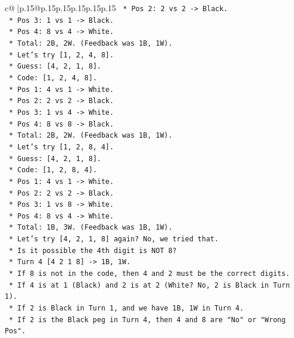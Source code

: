 \documentclass{article}
\begin{document}
{\begin{supertabular}{c@{$\;$}|p{.15\linewidth}@{}p{.15\linewidth}p{.15\linewidth}p{.15\linewidth}p{.15\linewidth}p{.15\linewidth}}
{{{\texttt{        *   Pos 2: 2 vs 2 {-}> Black.} \\
\texttt{        *   Pos 3: 1 vs 1 {-}> Black.} \\
\texttt{        *   Pos 4: 8 vs 4 {-}> White.} \\
\texttt{        *   Total: 2B, 2W. (Feedback was 1B, 1W).} \\
\texttt{    *   Let's try {[}1, 2, 4, 8{]}.} \\
\texttt{        *   Guess: {[}4, 2, 1, 8{]}.} \\
\texttt{        *   Code: {[}1, 2, 4, 8{]}.} \\
\texttt{        *   Pos 1: 4 vs 1 {-}> White.} \\
\texttt{        *   Pos 2: 2 vs 2 {-}> Black.} \\
\texttt{        *   Pos 3: 1 vs 4 {-}> White.} \\
\texttt{        *   Pos 4: 8 vs 8 {-}> Black.} \\
\texttt{        *   Total: 2B, 2W. (Feedback was 1B, 1W).} \\
\texttt{    *   Let's try {[}1, 2, 8, 4{]}.} \\
\texttt{        *   Guess: {[}4, 2, 1, 8{]}.} \\
\texttt{        *   Code: {[}1, 2, 8, 4{]}.} \\
\texttt{        *   Pos 1: 4 vs 1 {-}> White.} \\
\texttt{        *   Pos 2: 2 vs 2 {-}> Black.} \\
\texttt{        *   Pos 3: 1 vs 8 {-}> White.} \\
\texttt{        *   Pos 4: 8 vs 4 {-}> White.} \\
\texttt{        *   Total: 1B, 3W. (Feedback was 1B, 1W).} \\
\texttt{    *   Let's try {[}4, 2, 1, 8{]} again? No, we tried that.} \\
\texttt{    *   Is it possible the 4th digit is NOT 8?} \\
\texttt{        *   Turn 4 {[}4 2 1 8{]} {-}> 1B, 1W.} \\
\texttt{        *   If 8 is not in the code, then 4 and 2 must be the correct digits.} \\
\texttt{        *   If 4 is at 1 (Black) and 2 is at 2 (White? No, 2 is Black in Turn 1).} \\
\texttt{        *   If 2 is Black in Turn 1, and we have 1B, 1W in Turn 4.} \\
\texttt{        *   If 2 is the Black peg in Turn 4, then 4 and 8 are "No" or "Wrong Pos".} \\
}}}
\end{supertabular}}
\end{document}

